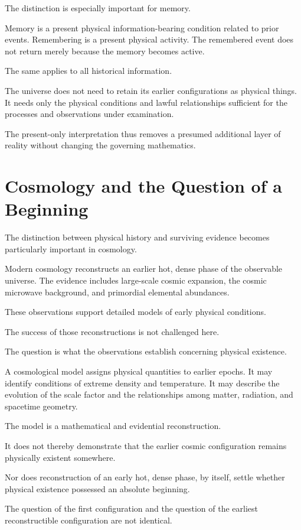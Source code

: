 \documentclass[12pt,onecolumn]{article}
\begin{document}
The distinction is especially important for memory.

Memory is a present physical information-bearing condition related to prior events. Remembering is a present physical activity. The remembered event does not return merely because the memory becomes active.

The same applies to all historical information.

The universe does not need to retain its earlier configurations as physical things. It needs only the physical conditions and lawful relationships sufficient for the processes and observations under examination.

The present-only interpretation thus removes a presumed additional layer of reality without changing the governing mathematics.

\section{Cosmology and the Question of a Beginning}

The distinction between physical history and surviving evidence becomes particularly important in cosmology.

Modern cosmology reconstructs an earlier hot, dense phase of the observable universe. The evidence includes large-scale cosmic expansion, the cosmic microwave background, and primordial elemental abundances.

These observations support detailed models of early physical conditions.

The success of those reconstructions is not challenged here.

The question is what the observations establish concerning physical existence.

A cosmological model assigns physical quantities to earlier epochs. It may identify conditions of extreme density and temperature. It may describe the evolution of the scale factor and the relationships among matter, radiation, and spacetime geometry.

The model is a mathematical and evidential reconstruction.

It does not thereby demonstrate that the earlier cosmic configuration remains physically existent somewhere.

Nor does reconstruction of an early hot, dense phase, by itself, settle whether physical existence possessed an absolute beginning.

The question of the first configuration and the question of the earliest reconstructible configuration are not identical.
\end{document}
